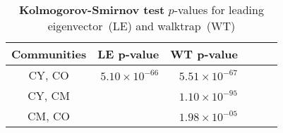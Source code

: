 \begin{table}[htb]
\small
\centering
\caption[Kolmogorov-Smirnov test]{\textbf{Kolmogorov-Smirnov test} $p$-values for leading eigenvector~(LE) and walktrap~(WT)}
\label{tab:n3-pvalues2}
\vspace*{5mm}
\begin{tabular}{crrrrr}
	\toprule
	 Communities & LE p-value & WT p-value\\
	\midrule 
    CY, CO & $5.10\times10^{-66}$ & $5.51\times 10^{-67}$\\
    CY, CM &          & $1.10\times10^{-95}$\\
    CM, CO &          & $1.98\times10^{-05}$\\ 
	\bottomrule
\end{tabular}
\end{table}